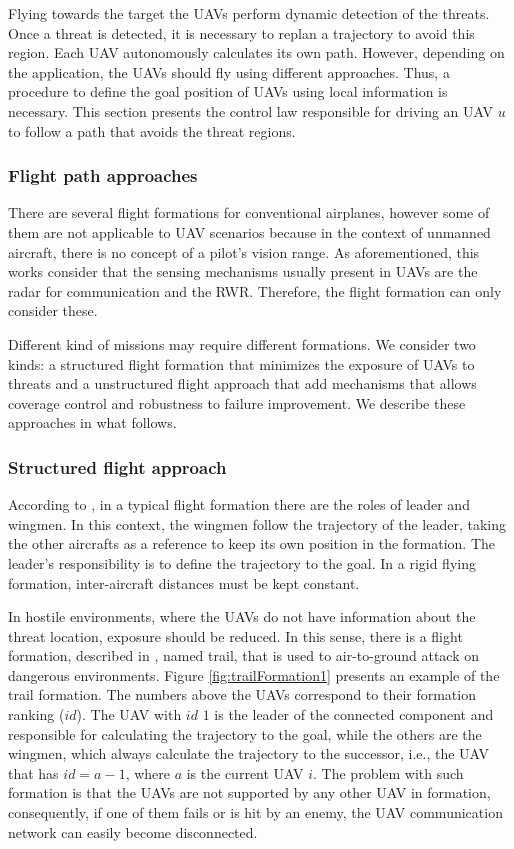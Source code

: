 Flying towards the target the UAVs perform dynamic detection of the threats. Once a threat is detected, it is necessary to replan a trajectory to avoid this region. Each UAV autonomously calculates its own path. However, depending on the application, the UAVs should fly using different approaches. Thus, a procedure to define the goal position of UAVs using local information is necessary. This section presents the control law responsible for driving an UAV $u$ to follow a path that avoids the threat regions.

\subsubsection{Flight path approaches}

There are several flight formations for conventional airplanes, however some of them are not applicable to UAV scenarios because in the context of unmanned aircraft, there is no concept of a pilot's vision range. As aforementioned, this works consider that the sensing mechanisms usually present in UAVs are the radar for communication and the RWR. Therefore, the flight formation can only consider these.

Different kind of missions may require different formations. We consider two kinds: a structured flight formation that minimizes the exposure of UAVs to threats and a unstructured flight approach that add mechanisms that allows coverage control and robustness to failure improvement. We describe these approaches in what follows.

\subsubsection{Structured flight approach}

According to \cite{giulietti_2000}, in a typical flight formation there are the roles of leader and wingmen. In this context, the wingmen follow the trajectory of the leader, taking the other aircrafts as a reference to keep its own position in the formation. The leader's responsibility is to define the trajectory to the goal. In a rigid flying formation, inter-aircraft distances must be kept constant. 
 
In hostile environments, where the UAVs do not have information about the threat location, exposure should be reduced. In this sense, there is a flight formation, described in \cite{borges_2017}, named trail, that is used to air-to-ground attack on dangerous environments. Figure \ref{fig:trailFormation1} presents an example of the trail formation. The numbers above the UAVs correspond to their formation ranking ($id$). The UAV with $id$ $1$ is the leader of the connected component and responsible for calculating the trajectory to the goal, while the others are the wingmen, which always calculate the trajectory to the successor, i.e., the UAV that has $id = a -1$, where $a$ is the current UAV $i$. The problem with such formation is that the UAVs are not supported by any other UAV in formation, consequently, if one of them fails or is hit by an enemy, the UAV communication network can easily become disconnected.
  
